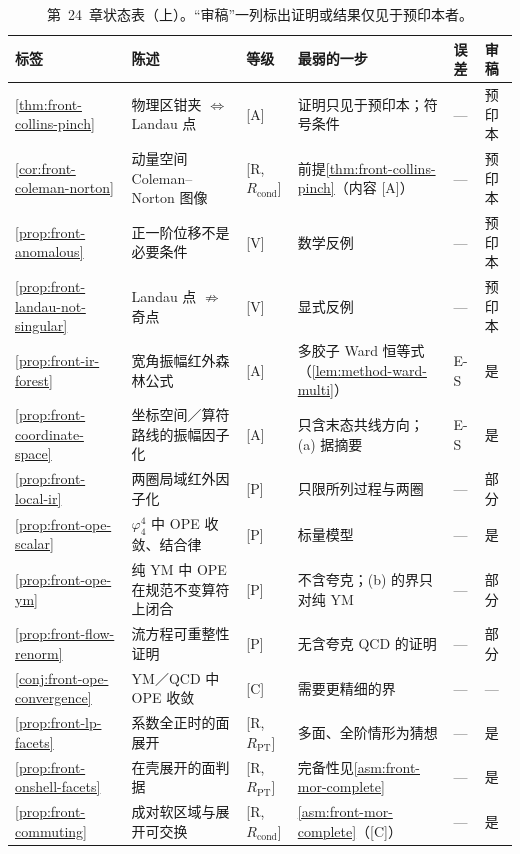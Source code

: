 \begin{table}[htbp]
\centering
\caption{第~24~章状态表（上）。“审稿”一列标出证明或结果仅见于预印本者。}\label{tab:front-status}
\footnotesize
\renewcommand{\arraystretch}{1.08}
\begin{tabularx}{\textwidth}{@{}p{1.75cm}>{\raggedright\arraybackslash}Xp{1.35cm}>{\raggedright\arraybackslash}p{3.6cm}p{0.75cm}p{0.95cm}@{}}
\toprule
标签 & 陈述 & 等级 & 最弱的一步 & 误差 & 审稿 \\
\midrule
\cref{thm:front-collins-pinch} & 物理区钳夹 $\Leftrightarrow$ Landau 点 & [A] & 证明只见于预印本；符号条件 & — & 预印本 \\
\cref{cor:front-coleman-norton} & 动量空间 Coleman--Norton 图像 & [R, $R_{\mathrm{cond}}$] & 前提\cref{thm:front-collins-pinch}（内容 [A]） & — & 预印本 \\
\cref{prop:front-anomalous} & 正一阶位移不是必要条件 & [V] & 数学反例 & — & 预印本 \\
\cref{prop:front-landau-not-singular} & Landau 点 $\not\Rightarrow$ 奇点 & [V] & 显式反例 & — & 预印本 \\
\cref{prop:front-ir-forest} & 宽角振幅红外森林公式 & [A] & 多胶子 Ward 恒等式（\cref{lem:method-ward-multi}） & E-S & 是 \\
\cref{prop:front-coordinate-space} & 坐标空间／算符路线的振幅因子化 & [A] & 只含末态共线方向；(a) 据摘要 & E-S & 是 \\
\cref{prop:front-local-ir} & 两圈局域红外因子化 & [P] & 只限所列过程与两圈 & — & 部分 \\
\cref{prop:front-ope-scalar} & $\varphi^4_4$ 中 OPE 收敛、结合律 & [P] & 标量模型 & — & 是 \\
\cref{prop:front-ope-ym} & 纯 YM 中 OPE 在规范不变算符上闭合 & [P] & 不含夸克；(b) 的界只对纯 YM & — & 部分 \\
\cref{prop:front-flow-renorm} & 流方程可重整性证明 & [P] & 无含夸克 QCD 的证明 & — & 部分 \\
\cref{conj:front-ope-convergence} & YM／QCD 中 OPE 收敛 & [C] & 需要更精细的界 & — & — \\
\cref{prop:front-lp-facets} & 系数全正时的面展开 & [R, $R_{\mathrm{PT}}$] & 多面、全阶情形为猜想 & — & 是 \\
\cref{prop:front-onshell-facets} & 在壳展开的面判据 & [R, $R_{\mathrm{PT}}$] & 完备性见\cref{asm:front-mor-complete} & — & 是 \\
\cref{prop:front-commuting} & 成对软区域与展开可交换 & [R, $R_{\mathrm{cond}}$] & \cref{asm:front-mor-complete}（[C]） & — & 是 \\

\end{tabularx}
\end{table}
